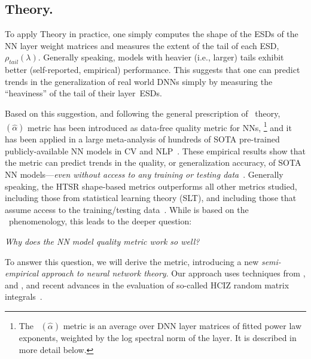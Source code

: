 \subsection{\HTSR Theory.}

To apply \HTSR Theory in practice, one simply computes the shape of the ESDs of the NN layer weight matrices and measures the extent of the tail of each ESD, $\rho_{tail}(\lambda)$.
Generally speaking, models with heavier (i.e., larger) tails exhibit better (self-reported, empirical) performance. 
This suggests that one can predict trends in the generalization of real world DNNs simply by measuring the ``heaviness'' of the tail of their layer~ESDs.

Based on this suggestion, and following the general prescription of \HTSR~theory, \ALPHAHAT~$(\hat{\alpha})$ metric has been introduced as data-free quality metric for NNs,%
\footnote{The \ALPHAHAT~$(\hat{\alpha})$ metric is an average over DNN layer matrices of fitted power law exponents, weighted by the log spectral norm of the layer.  It is described in more detail below.} 
and it has been applied in a large meta-analysis of hundreds of SOTA pre-trained publicly-available NN models in CV and NLP~\cite{MM20a_trends_NatComm,YTHx22_TR,YTHx23_KDD}.
%
These empirical results show that the \ALPHAHAT metric can predict trends in the quality, or generalization accuracy, of SOTA NN models---\emph{even without access to any training or testing data}~\cite{MM20a_trends_NatComm}.
Generally speaking, the HTSR shape-based metrics outperforms all other metrics studied, including those from statistical learning theory (SLT), and including those that assume access to the training/testing data~\cite{YTHx22_TR,YTHx23_KDD}.
While \ALPHAHAT is based on the \HTSR~phenomenology, this leads to the deeper question: 
%
\begin{center}
\emph{Why does the \ALPHAHAT NN model quality metric work so well?}
\end{center}
%
To answer this question, we will derive the \ALPHAHAT metric, introducing a new \emph{semi-empirical approach to neural network theory}.
Our approach uses techniques from \STATMECH, \RMT and \HTRMT, and recent advances in the evaluation of so-called HCIZ random matrix integrals~\cite{potters_bouchaud_2020,Tanaka2008}.

